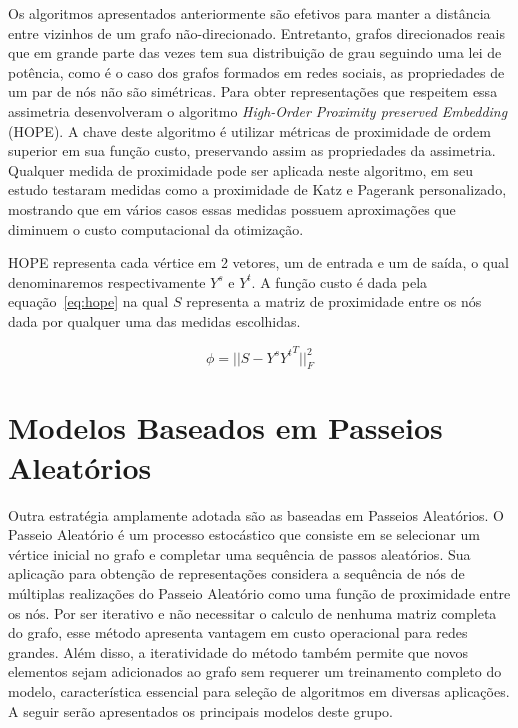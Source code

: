 Os algoritmos apresentados anteriormente são efetivos para manter a distância
entre vizinhos de um grafo não-direcionado.
Entretanto, grafos direcionados reais que em grande parte das vezes tem sua
distribuição de grau seguindo uma lei de potência, como é o caso dos grafos
formados em redes sociais, as propriedades de um par de nós não são simétricas.
Para obter representações que respeitem essa assimetria \citet{ou16}
desenvolveram o algoritmo \textit{High-Order Proximity preserved Embedding}
(HOPE).
A chave deste algoritmo é utilizar métricas de proximidade de ordem superior em
sua função custo, preservando assim as propriedades da assimetria.
Qualquer medida de proximidade pode ser aplicada neste algoritmo, \citet{ou16}
em seu estudo testaram medidas como a proximidade de Katz e Pagerank
personalizado, mostrando que em vários casos essas medidas possuem aproximações
que diminuem o custo computacional da otimização.

HOPE representa cada vértice em 2 vetores, um de entrada e um de saída, o qual
denominaremos respectivamente $Y^s$ e $Y^t$.
A função custo é dada pela equação~\ref{eq:hope} na qual $S$ representa a matriz
de proximidade entre os nós dada por qualquer uma das medidas escolhidas.

\begin{equation} \label{eq:hope}
    \phi = \vert\vert S - Y^s {Y^t}^{T} \vert\vert^2_F
\end{equation}

\section{Modelos Baseados em Passeios Aleatórios}

Outra estratégia amplamente adotada são as baseadas em Passeios Aleatórios.
O Passeio Aleatório é um processo estocástico que consiste em se selecionar um
vértice inicial no grafo e completar uma sequência de passos aleatórios.
Sua aplicação para obtenção de representações considera a sequência de nós de
múltiplas realizações do Passeio Aleatório como uma função de proximidade entre
os nós.
Por ser iterativo e não necessitar o calculo de nenhuma matriz completa do
grafo, esse método apresenta vantagem em custo operacional para redes grandes.
Além disso, a iteratividade do método também permite que novos elementos sejam
adicionados ao grafo sem requerer um treinamento completo do modelo,
característica essencial para seleção de algoritmos em diversas aplicações.
A seguir serão apresentados os principais modelos deste grupo.

